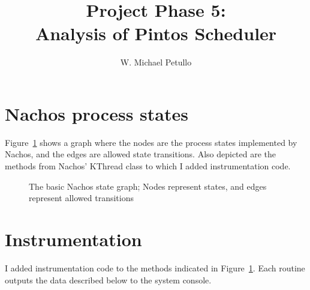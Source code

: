 \documentclass{article}
\title{Project Phase 5: \\ Analysis of Pintos Scheduler}
\author{W. Michael Petullo}
\newcommand{\command}[1]{{\sffamily#1}}
\begin{document}
\maketitle

\section{Nachos process states}
Figure~\ref{fig:states} shows a graph where the nodes are the process
states implemented by Nachos, and the edges are allowed state transitions.
Also depicted are the methods from Nachos' \command{KThread} class
to which I added instrumentation code. 

\begin{figure}[h]
\centering
\begin{tikzpicture}

\end{tikzpicture}
\caption{The basic Nachos state graph; Nodes represent states, and edges represent allowed transitions}
\label{fig:states}
\end{figure}

\section{Instrumentation}
I added instrumentation code to the methods indicated in Figure~\ref{fig:states}.
Each routine outputs the data described below to the system console.
\end{document}

